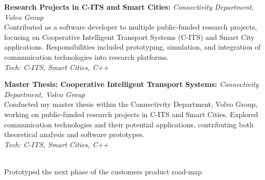 \textbf{Research Projects in C-ITS and Smart Cities:} \textit{Connectivity Department, Volvo Group} \\
Contributed as a software developer to multiple public-funded research projects, focusing on Cooperative Intelligent Transport Systems (C-ITS) and Smart City applications. Responsibilities included prototyping, simulation, and integration of communication technologies into research platforms. \\
\textit{Tech: C-ITS, Smart Cities, C++} \\
\SmallSep

\textbf{Master Thesis: Cooperative Intelligent Transport Systems:} \textit{Connectivity Department, Volvo Group} \\
Conducted my master thesis within the Connectivity Department, Volvo Group, working on public-funded research projects in C-ITS and Smart Cities. Explored communication technologies and their potential applications, contributing both theoretical analysis and software prototypes. \\
\textit{Tech: C-ITS, Smart Cities, C++} \\
\SmallSep

 \\
Prototyped the next phase of the customers product road-map.